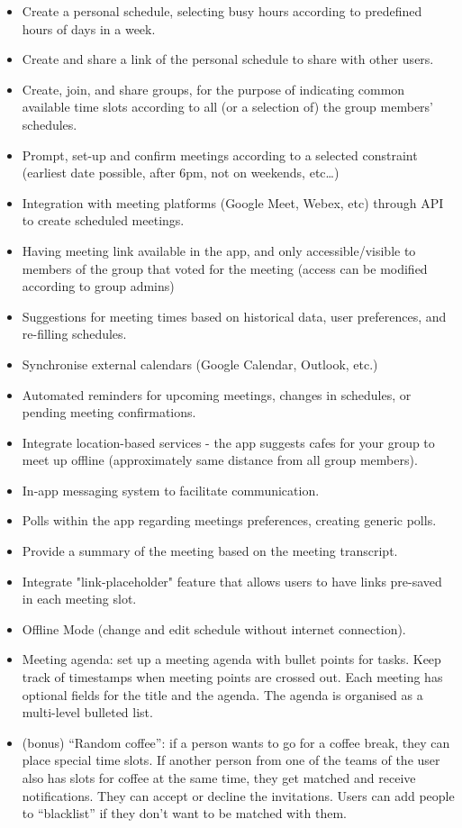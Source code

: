 \documentclass{article}
\begin{document}
\begin{itemize}
    \item{Create a personal schedule, selecting busy hours according to predefined
        hours of days in a week.}
    \item{Create and share a link of the personal schedule to share with other
        users.}
    \item{Create, join, and share groups, for the purpose of indicating common
        available time slots according to all (or a selection of) the group
        members’ schedules.}
    \item{Prompt, set-up and confirm meetings according to a selected constraint
        (earliest date possible, after 6pm, not on weekends, etc…)}
    \item{Integration with meeting platforms (Google Meet, Webex, etc) through API
        to create scheduled meetings.}
    \item{Having meeting link available in the app, and only accessible/visible to
        members of the group that voted for the meeting (access can be modified
        according to group admins)}
    \item{Suggestions for meeting times based on historical data, user preferences,
        and re-filling schedules.}
    \item{Synchronise external calendars (Google Calendar, Outlook, etc.)}
    \item{Automated reminders for upcoming meetings, changes in schedules, or
        pending meeting confirmations.}
    \item{Integrate location-based services - the app suggests cafes for your group
        to meet up offline (approximately same distance from all group members).}
    \item{In-app messaging system to facilitate communication.}
    \item{Polls within the app regarding meetings preferences, creating generic polls.}
    \item{Provide a summary of the meeting based on the meeting transcript.}
    \item{Integrate "link-placeholder" feature that allows users to have links
        pre-saved in each meeting slot.}
    \item{Offline Mode (change and edit schedule without internet connection).}
    \item{Meeting agenda: set up a meeting agenda with bullet points for tasks.
        Keep track of timestamps when meeting points are crossed out. Each meeting
        has optional fields for the title and the agenda. The agenda is organised
        as a multi-level bulleted list.}
    \item{(bonus) “Random coffee”: if a person wants to go for a coffee break,
        they can place special time slots. If another person from one of the teams
        of the user also has slots for coffee at the same time, they get
        matched and receive notifications. They can accept or decline the
        invitations. Users can add people to “blacklist” if they don’t want to
        be matched with them.}
\end{itemize}
\end{document}

